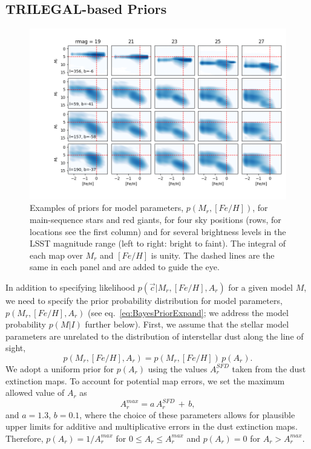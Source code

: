 \subsection{TRILEGAL-based Priors \label{sec:priors}} 

\begin{figure}[t!]
\hskip -0.5in
\includegraphics[width=1.07\textwidth,angle=0]{figures/Stripe82priorMosaic.png}
\vskip -0.4in  
\caption{Examples of priors for model parameters, $p(M_r, [Fe/H])$, for main-sequence stars and red giants,
  for four sky positions (rows, for locations see the first column) and for several brightness levels in the LSST
  magnitude range (left to right: bright to faint). The integral of each map over $M_r$ and $[Fe/H]$ is unity. 
  The dashed lines are the same in each panel and are added to guide the eye. 
}
\label{fig:priorsAstroLab}
\end{figure}


In addition to specifying likelihood $p(\vec{c}|M_r, [Fe/H], A_r)$ for a given model $M$, we need to specify
the prior probability distribution for model parameters, $p(M_r, [Fe/H],A_r)$ (see eq.~\ref{eq:BayesPriorExpand};
we address the model probability $p(M|I)$ further below). First, we assume that the stellar model parameters
are unrelated to the distribution of interstellar dust along the line of sight,
\begin{equation}
 \label{eq:BayesPrior2}
               p(M_r, [Fe/H],A_r) = p(M_r, [Fe/H]) \, p(A_r).
\end{equation}
We adopt a uniform prior for $p(A_r)$ using the values $A_r^{SFD}$ taken from the \cite{schlegel_maps_1998}
dust extinction maps. To account for potential map errors, we set the maximum allowed value of $A_r$ as
\begin{equation}
          A_r^{max} =  a \, A_r^{SFD} \, + \, b,
\end{equation}
and $a=1.3$, $b=0.1$, where the choice of these parameters allows for plausible upper limits for additive and
multiplicative errors in the dust extinction maps. Therefore, $p(A_r) = 1/A_r^{max}$ for $0 \le A_r \le A_r^{max}$
and $p(A_r) = 0$ for $A_r > A_r^{max}$.  

